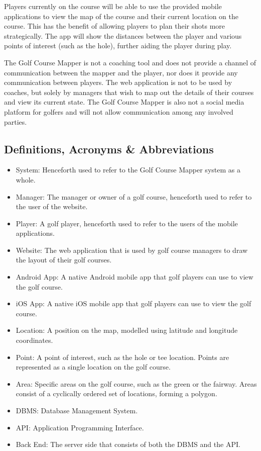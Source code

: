 \documentclass{article}
\begin{document}
    Players currently on the course will be able to use the provided mobile
    applications to view the map of the course and their current location on
    the course. This has the benefit of allowing players to plan their shots
    more strategically. The app will show the distances between the player and
    various points of interest (such as the hole), further aiding the player
    during play.

    The Golf Course Mapper is not a coaching tool and does not provide a
    channel of communication between the mapper and the player, nor does it
    provide any communication between players. The web application is not to be
    used by coaches, but solely by managers that wish to map out the details of
    their courses and view its current state. The Golf Course Mapper is also
    not a social media platform for golfers and will not allow communication
    among any involved parties.

    \subsection{Definitions, Acronyms \& Abbreviations}
    \begin{itemize}
        \item
            System: Henceforth used to refer to the Golf Course Mapper system
            as a whole.
        \item
            Manager: The manager or owner of a golf course, henceforth used to
            refer to the user of the website.
        \item
            Player: A golf player, henceforth used to refer to the users of the
            mobile applications.
        \item
            Website: The web application that is used by golf course managers
            to draw the layout of their golf courses.
        \item
            Android App: A native Android mobile app that golf players can use to
            view the golf course.
        \item
            iOS App: A native iOS mobile app that golf players can use to view
            the golf course.
        \item
            Location: A position on the map, modelled using latitude and longitude
            coordinates.
        \item
            Point: A point of interest, such as the hole or tee location.
            Points are represented as a single location on the golf course.
        \item
            Area: Specific areas on the golf course, such as the green or the
            fairway. Areas consist of a cyclically ordered set of locations,
            forming a polygon.
        \item
            DBMS: Database Management System.
        \item
            API: Application Programming Interface.
        \item
            Back End: The server side that consists of both the DBMS and the
            API.
    \end{itemize}
\end{document}
